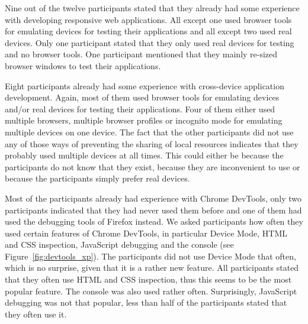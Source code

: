 Nine out of the twelve participants stated that they already had some experience with developing responsive web applications. All except one used browser tools for emulating devices for testing their applications and all except two used real devices. Only one participant stated that they only used real devices for testing and no browser tools. One participant mentioned that they mainly re-sized browser windows to test their applications.

Eight participants already had some experience with cross-device application development. Again, most of them used browser tools for emulating devices and/or real devices for testing their applications. Four of them either used multiple browsers, multiple browser profiles or incognito mode for emulating multiple devices on one device. The fact that the other participants did not use any of those ways of preventing the sharing of local resources indicates that they probably used multiple devices at all times. This could either be because the participants do not know that they exist, because they are inconvenient to use or because the participants simply prefer real devices.

Most of the participants already had experience with Chrome DevTools, only two participants indicated that they had never used them before and one of them had used the debugging tools of Firefox instead. We asked participants how often they used certain features of Chrome DevTools, in particular Device Mode, HTML and CSS inspection, JavaScript debugging and the console (see Figure~\ref{fig:devtools_xp}). The participants did not use Device Mode that often, which is no surprise, given that it is a rather new feature. All participants stated that they often use HTML and CSS inspection, thus this seems to be the most popular feature. The console was also used rather often. Surprisingly, JavaScript debugging was not that popular, less than half of the participants stated that they often use it.

